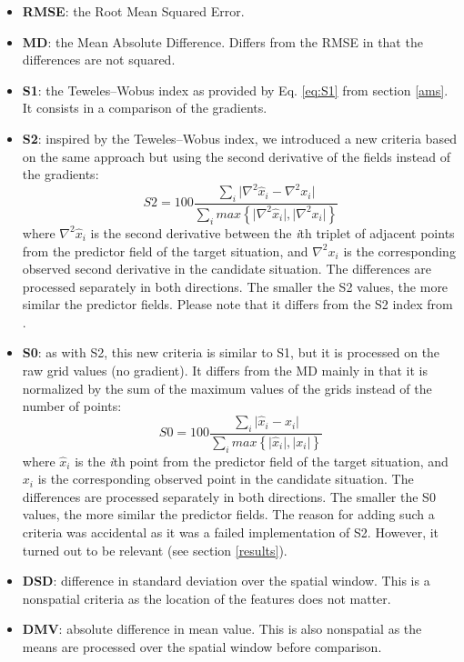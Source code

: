 \documentclass[draft]{agujournal2019}
\begin{document}
\begin{itemize}
	\item \textbf{RMSE}: the Root Mean Squared Error.
	\item \textbf{MD}: the Mean Absolute Difference. Differs from the RMSE in that the differences are not squared.
	\item \textbf{S1}: the Teweles--Wobus index as provided by Eq. \ref{eq:S1} from section \ref{ams}. It consists in a comparison of the gradients. 
	\item \textbf{S2}: inspired by the Teweles--Wobus index, we introduced a new criteria based on the same approach but using the second derivative of the fields instead of the gradients:
	\begin{equation}
		\label{eq:S2}
		S2=100 \frac {\displaystyle \sum_{i} \vert \nabla^{2}\hat{x}_{i} - \nabla^{2} x_{i} \vert}
		{\displaystyle \sum_{i} max\left\lbrace \vert \nabla^{2}\hat{x}_{i} \vert , \vert \nabla^{2} x_{i} \vert \right\rbrace }
	\end{equation}
	where $\nabla^{2} \hat{x}_{i}$ is the second derivative between the \textit{i}th triplet of adjacent points from the predictor field of the target situation, and $\nabla^{2} x_{i}$ is the corresponding observed second derivative in the candidate situation. The differences are processed separately in both directions. The smaller the S2 values, the more similar the predictor fields. Please note that it differs from the S2 index from .
	\item \textbf{S0}: as with S2, this new criteria is similar to S1, but it is processed on the raw grid values (no gradient). It differs from the MD mainly in that it is normalized by the sum of the maximum values of the grids instead of the number of points:
	\begin{equation}
		\label{eq:S0}
		S0=100 \frac {\displaystyle \sum_{i} \vert \hat{x}_{i} - x_{i} \vert}
		{\displaystyle \sum_{i} max\left\lbrace \vert \hat{x}_{i} \vert , \vert x_{i} \vert \right\rbrace }
	\end{equation}
	where $\hat{x}_{i}$ is the \textit{i}th point from the predictor field of the target situation, and $x_{i}$ is the corresponding observed point in the candidate situation. The differences are processed separately in both directions. The smaller the S0 values, the more similar the predictor fields. The reason for adding such a criteria was accidental as it was a failed implementation of S2. However, it turned out to be relevant (see section \ref{results}).
	\item \textbf{DSD}: difference in standard deviation over the spatial window. This is a nonspatial criteria as the location of the features does not matter.
	\item \textbf{DMV}: absolute difference in mean value. This is also nonspatial as the means are processed over the spatial window before comparison.
\end{itemize}
\end{document}
